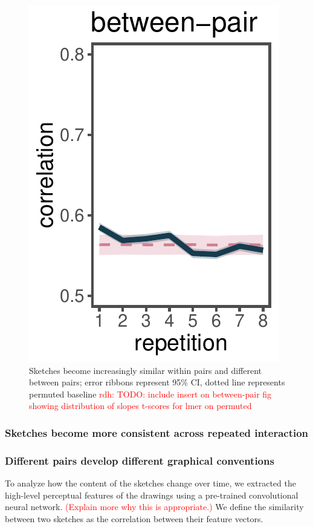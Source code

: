 \documentclass[10pt,letterpaper]{article}
\newcommand{\red}[1]{\textcolor{Red}{#1}}
\newcommand{\rdh}[1]{\textcolor{Red}{rdh: #1}}
\begin{document}
\begin{figure}
\includegraphics[width=\linewidth/2-1]{figures/across.pdf}
\caption{Sketches become increasingly similar within pairs and different between pairs; error ribbons represent 95\% CI, dotted line represents permuted baseline \rdh{TODO: include insert on between-pair fig showing distribution of slopes t-scores for lmer on permuted}} \label{within-across}
\end{figure}


\subsubsection{Sketches become more consistent across repeated interaction}


\subsubsection{Different pairs develop different graphical conventions} 
To analyze how the content of the sketches change over time, we extracted the high-level perceptual features of the drawings using a pre-trained convolutional neural network. 
\red{(Explain more why this is appropriate.) }
We define the similarity between two sketches as the correlation between their feature vectors.
\end{document}
